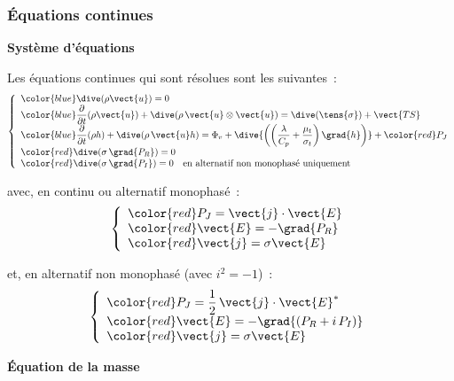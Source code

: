 \subsubsection*{\'Equations continues}

{\bf Syst\`eme d'\'equations}
\nopagebreak

Les \'equations continues qui sont r\'esolues sont les suivantes~:
\begin{equation}
\left\{\begin{array}{l}
{\color{blue}\dive(\rho \vect{u}) = 0}\\
{\color{blue}\displaystyle\frac{\partial}{\partial t}(\rho \vect{u})
+\dive(\rho\, \vect{u} \otimes \vect{u})
=\dive(\tens{\sigma}) + \vect{TS}}  \\
{\color{blue}\displaystyle\frac{\partial}{\partial t}(\rho h)
+\dive(\rho\, \vect{u} h)
=\Phi_v +
\dive{\left(\left(\frac{\lambda}{C_p}+\frac{\mu_t}{\sigma_t}\right)\grad{h}\right)}
+ {\color{red}P_J}}\\
{\color{red}\dive(\sigma\,\grad{P_R})=0}\\
{\color{red}\dive(\sigma\,\grad{P_I})=0}\text{\ \ \ en alternatif non monophas\'e uniquement}\\
\end{array}\right.
\end{equation}

avec, en continu ou alternatif monophas\'e~:
\begin{equation}
\left\{\begin{array}{l}
{\color{red}P_J=\vect{j}\cdot\vect{E}} \\
{\color{red}\vect{E}=-\grad{P_R}}\\
{\color{red}\vect{j}=\sigma\vect{E}}\\
\end{array}\right.
\end{equation}

et, en alternatif non monophas\'e (avec $i^2=-1$)~:
\begin{equation}
\left\{\begin{array}{l}
{\color{red}\displaystyle P_J=\frac{1}{2}\,\vect{j}\cdot\vect{E}^*}\\
{\color{red}\vect{E}=-\grad{(P_R+i\,P_I)}}\\
{\color{red}\vect{j}=\sigma\vect{E}}\\
\end{array}\right.
\end{equation}

\vspace*{0,5cm}
{\bf \'Equation de la masse}
\nopagebreak

